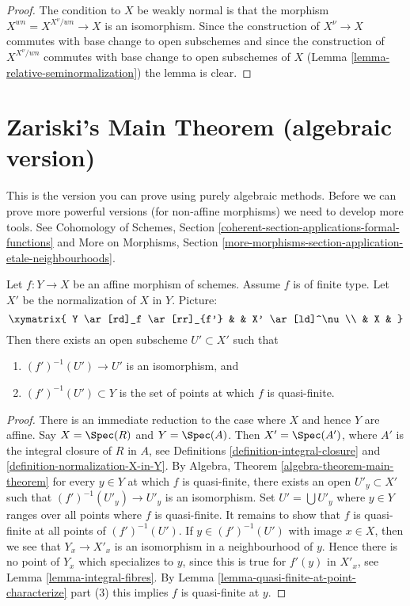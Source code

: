 \begin{proof}
The condition to $X$ be weakly normal is that the morphism
$X^{wn} = X^{X^\nu/wn} \to X$ is an isomorphism. Since the construction
of $X^\nu \to X$ commutes with base change to open subschemes
and since the construction of $X^{X^\nu/wn}$ commutes with base
change to open subschemes of $X$ (Lemma \ref{lemma-relative-seminormalization})
the lemma is clear.
\end{proof}










\section{Zariski's Main Theorem (algebraic version)}
\label{section-Zariski}

\noindent
This is the version you can prove using purely algebraic methods.
Before we can prove more powerful versions (for non-affine morphisms)
we need to develop more tools. See Cohomology of Schemes, Section
\ref{coherent-section-applications-formal-functions}
and
More on Morphisms, Section
\ref{more-morphisms-section-application-etale-neighbourhoods}.

\begin{theorem}
\label{theorem-main-theorem}
Let $f : Y \to X$ be an affine morphism of schemes.
Assume $f$ is of finite type.
Let $X'$ be the normalization of $X$ in $Y$. Picture:
$$
\xymatrix{
Y \ar[rd]_f \ar[rr]_{f'} & & X' \ar[ld]^\nu \\
& X &
}
$$
Then there exists an open subscheme $U' \subset X'$ such that
\begin{enumerate}
\item $(f')^{-1}(U') \to U'$ is an isomorphism, and
\item $(f')^{-1}(U') \subset Y$ is the set of points at which
$f$ is quasi-finite.
\end{enumerate}
\end{theorem}

\begin{proof}
There is an immediate reduction to the case where $X$ and hence $Y$
are affine. Say $X = \Spec(R)$ and $Y = \Spec(A)$.
Then $X' = \Spec(A')$, where $A'$ is the integral closure of
$R$ in $A$, see Definitions \ref{definition-integral-closure}
and \ref{definition-normalization-X-in-Y}. By
Algebra, Theorem \ref{algebra-theorem-main-theorem}
for every $y \in Y$ at which $f$ is quasi-finite, there exists an
open $U'_y \subset X'$ such that $(f')^{-1}(U'_y) \to U'_y$
is an isomorphism. Set $U' = \bigcup U'_y$ where $y \in Y$ ranges
over all points where $f$ is quasi-finite. It remains to show that
$f$ is quasi-finite at all points of $(f')^{-1}(U')$.
If $y \in (f')^{-1}(U')$ with image $x \in X$, then we see that
$Y_x \to X'_x$ is an isomorphism in a neighbourhood of $y$. Hence
there is no point of $Y_x$ which specializes to $y$, since this
is true for $f'(y)$ in $X'_x$, see Lemma \ref{lemma-integral-fibres}.
By Lemma \ref{lemma-quasi-finite-at-point-characterize} part (3)
this implies $f$ is quasi-finite at $y$.
\end{proof}

